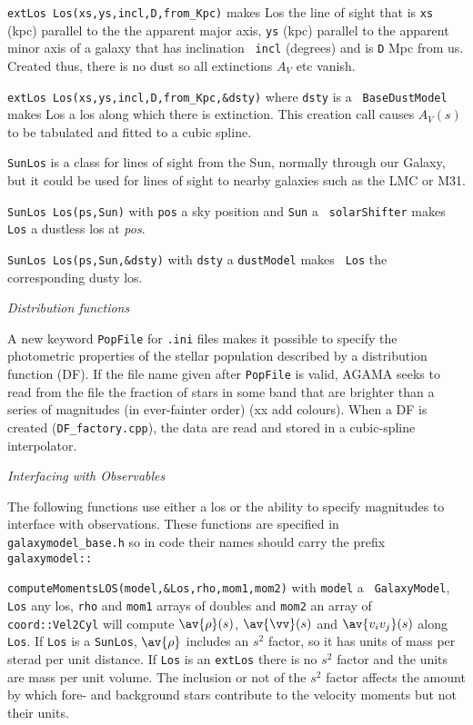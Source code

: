 \nwsec
{\tt extLos Los(xs,ys,incl,D,from\_Kpc)} makes Los the line of sight that is
{\tt xs} (kpc) parallel to the the apparent major axis, {\tt ys} (kpc)
parallel to the apparent minor axis of a galaxy that has inclination {\tt
incl} (degrees) and is {\tt D} Mpc from us. Created thus, there is no dust so all extinctions $A_V$ etc
vanish.

\nwsec
{\tt extLos Los(xs,ys,incl,D,from\_Kpc,\&dsty)} where {\tt dsty} is a {\tt
BaseDustModel} makes Los a los along which there is extinction. This creation
call causes $A_V(s)$ to be tabulated and fitted to a cubic spline.

\nwsec
{\tt SunLos} is a class for lines of sight from the Sun, normally through our
Galaxy, but it could be used for lines of sight to nearby galaxies such as
the LMC or M31.

\nwsec
{\tt SunLos Los(ps,Sun)} with {\tt pos} a sky position and {\tt Sun} a {\tt
solarShifter} makes {\tt Los} a dustless los at {\it pos}.

\nwsec
{\tt SunLos Los(ps,Sun,\&dsty)} with {\tt dsty} a {\tt dustModel} makes {\tt
Los} the corresponding dusty los.

\bigskip
\centerline{\it Distribution functions}

\nwsec
A new keyword {\tt PopFile} for {\tt .ini} files makes it possible to
specify the photometric properties of the stellar population described by a
distribution function (DF). If the file name given after  {\tt PopFile} is
valid, AGAMA seeks to read from the file the fraction of stars in some band
that are brighter than a series of magnitudes (in ever-fainter order) (xx add
colours). When a DF is created ({\tt DF\_factory.cpp}), the data are read and
stored in a cubic-spline interpolator.

\bigskip
\centerline{\it Interfacing with Observables} 

\nwsec
The following functions use either a los or the ability to specify magnitudes
to interface with observations. These functions are specified in {\tt
galaxymodel\_base.h} so in code their names should carry the prefix {\tt
galaxymodel::}

\nwsec
{\tt computeMomentsLOS(model,\&Los,rho,mom1,mom2)} with {\tt model} a {\tt
GalaxyModel},
{\tt Los} any los, {\tt rho} and {\tt mom1} arrays of doubles and {\tt mom2}
an array of {\tt 
coord::Vel2Cyl} will compute $\av{\rho}(s)$, $\av{\vv}(s)$ and
$\av{v_iv_j}(s)$ along {\tt Los}. If {\tt Los} is a {\tt SunLos}, $\av{\rho}$
includes an $s^2$ factor, so it has units of mass per sterad per unit
distance. If {\tt Los} is an {\tt extLos} there is no $s^2$ factor and the
units are mass per unit volume. The inclusion or not of the $s^2$ factor
affects the amount by which fore- and background stars contribute to the
velocity moments but not their units.

